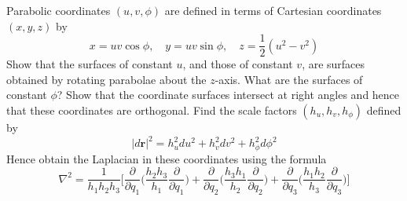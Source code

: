 \documentclass[a4paper]{article}
\begin{document}
\begin{qns}
Parabolic coordinates $(u,v,\phi)$ are defined in terms of Cartesian coordinates $(x,y,z)$ by
$$x = uv\cos\phi,\quad y = uv\sin\phi ,\quad z =\frac{1}{2}(u^2-v^2)$$
Show that the surfaces of constant $u$, and those of constant $v$, are surfaces obtained by rotating parabolae about the $z$-axis. What are the surfaces of constant $\phi$? Show that the coordinate surfaces intersect at right angles and hence that these coordinates are orthogonal. Find the scale factors $(h_u,h_v,h_\phi)$ defined by
$$|d\mathbf{r}|^2=h_u^2du^2+h_v^2dv^2+h_\phi^2d\phi^2$$
Hence obtain the Laplacian in these coordinates using the formula
$$\nabla^2=\frac{1}{h_1h_2h_3}\bigg[\frac{\partial}{\partial q_1}\bigg(\frac{h_2h_3}{h_1}\frac{\partial}{\partial q_1}\bigg)+\frac{\partial}{\partial q_2}\bigg(\frac{h_3h_1}{h_2}\frac{\partial}{\partial q_2}\bigg)+\frac{\partial}{\partial q_3}\bigg(\frac{h_1h_2}{h_3}\frac{\partial}{\partial q_3}\bigg)\bigg]$$
\end{qns}
\end{document}
